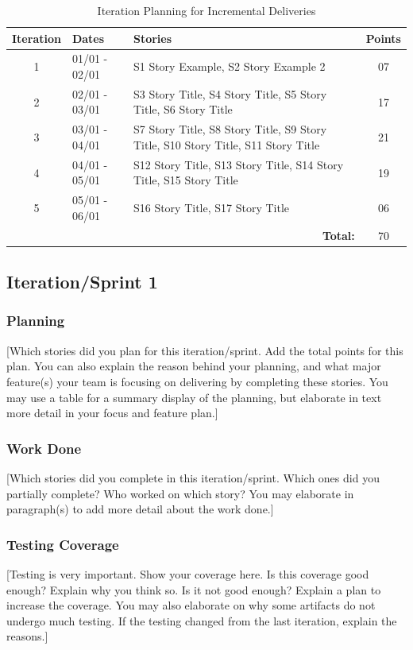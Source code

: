 \documentclass{article}
\begin{document}
\begin{table}[h!]
\centering
\begin{tabular}{c l p{7cm} c}
\hline
\textbf{Iteration} & \textbf{Dates} & \textbf{Stories} & \textbf{Points} \\
\hline
1 & 01/01 - 02/01 & S1 Story Example, S2 Story Example 2 & 07 \\ \hline
2 & 02/01 - 03/01 & S3 Story Title, S4 Story Title, S5 Story Title, S6 Story Title & 17 \\ \hline
3 & 03/01 - 04/01 & S7 Story Title, S8 Story Title, S9 Story Title, S10 Story Title, S11 Story Title & 21 \\ \hline
4 & 04/01 - 05/01 & S12 Story Title, S13 Story Title, S14 Story Title, S15 Story Title & 19 \\ \hline
5 & 05/01 - 06/01 & S16 Story Title, S17 Story Title & 06 \\ \hline
\multicolumn{3}{r}{\bf Total: } & 70 \\ \hline
\end{tabular}
\caption{Iteration Planning for Incremental Deliveries}
\end{table}

\subsection{Iteration/Sprint 1}
\subsubsection{Planning}
[Which stories did you plan for this iteration/sprint. Add the total points for this plan. You can also explain the reason behind your planning, and what major feature(s) your team is focusing on delivering by completing these stories. You may use a table for a summary display of the planning, but elaborate in text more detail in your focus and feature plan.]

\subsubsection{Work Done}
[Which stories did you complete in this iteration/sprint. Which ones did you partially complete? Who worked on which story? You may elaborate in paragraph(s) to add more detail about the work done.]

\subsubsection{Testing Coverage}
[Testing is very important. Show your coverage here. Is this coverage good enough? Explain why you think so. Is it not good enough? Explain a plan to increase the coverage. You may also elaborate on why some artifacts do not undergo much testing. If the testing changed from the last iteration, explain the reasons.]
\end{document}
